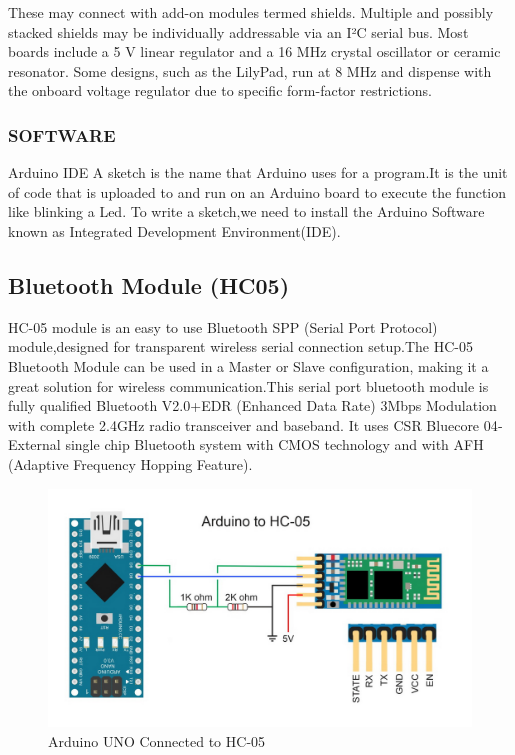 \documentclass[MTech]{iitmdiss}
\begin{document}
These may connect with add-on modules termed shields. Multiple and possibly stacked shields may be individually addressable via an I²C serial bus. Most boards include a 5 V linear regulator and a 16 MHz crystal oscillator or ceramic resonator. Some designs, such as the LilyPad, run at 8 MHz and dispense with the onboard voltage regulator due to specific form-factor restrictions.

\subsubsection{SOFTWARE}

Arduino IDE
A sketch is the name that Arduino uses for a program.It is the unit of code that is uploaded to and run on an Arduino board to execute the function like blinking a Led. To write a sketch,we need to install the Arduino Software known as Integrated Development Environment(IDE).

\subsection{Bluetooth Module (HC05)}

HC-05 module is an easy to use Bluetooth SPP (Serial Port Protocol) module,designed for transparent wireless serial connection setup.The HC-05 Bluetooth Module can be used in a Master or Slave configuration, making it a great solution for wireless communication.This serial port bluetooth module is fully qualified Bluetooth V2.0+EDR (Enhanced Data Rate) 3Mbps Modulation with complete 2.4GHz radio transceiver and baseband. It uses CSR Bluecore 04‐External single chip Bluetooth system with CMOS technology and with AFH (Adaptive Frequency Hopping Feature).

\begin{figure}[h!]
	\includegraphics[scale=0.3]{ffigures/hc_conn}
	\centering
	\caption{Arduino UNO Connected to HC-05}
	\label{fig:hc05}
	
\end{figure}
\end{document}
